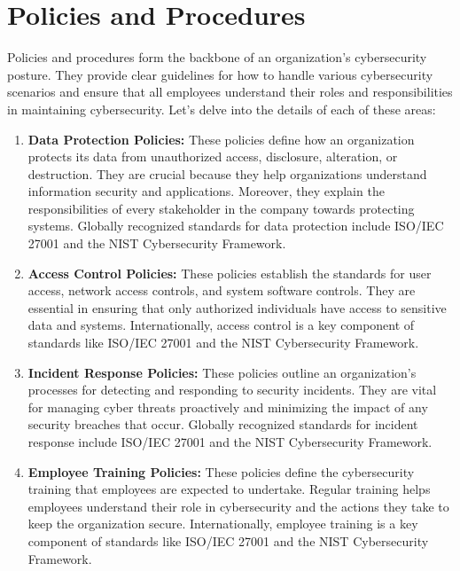\documentclass{article}
\begin{document}
\section{Policies and Procedures}
Policies and procedures form the backbone of an organization’s cybersecurity posture. They provide clear guidelines for how to handle various cybersecurity scenarios and ensure that all employees understand their roles and responsibilities in maintaining cybersecurity\cite{united-states-cybersecurity-and-infrastructure-security-agency-2023}\cite{pandey-2019}\cite{shacklett-2019}.
Let’s delve into the details of each of these areas:
\begin{enumerate}[label=\alph*)]
    \item \textbf{Data Protection Policies:} These policies define how an organization protects its data from unauthorized access, disclosure, alteration, or destruction\cite{united-states-cybersecurity-and-infrastructure-security-agency-2023}. They are crucial because they help organizations understand information security and applications. Moreover, they explain the responsibilities of every stakeholder in the company towards protecting systems\cite{pandey-2019}. Globally recognized standards for data protection include ISO/IEC 27001\cite{shacklett-2019} and the NIST Cybersecurity Framework\cite{the-center-for-internet-security-inc-no-date}.

    \item \textbf{Access Control Policies:} These policies establish the standards for user access, network access controls, and system software controls\cite{securityscorecard-2023}. They are essential in ensuring that only authorized individuals have access to sensitive data and systems\cite{microsoft-no-date}. Internationally, access control is a key component of standards like ISO/IEC 27001\cite{shacklett-2019} and the NIST Cybersecurity Framework\cite{the-center-for-internet-security-inc-no-date}.
    \item \textbf{Incident Response Policies:} These policies outline an organization’s processes for detecting and responding to security incidents\cite{united-states-cybersecurity-and-infrastructure-security-agency-2023}. They are vital for managing cyber threats proactively and minimizing the impact of any security breaches that occur. Globally recognized standards for incident response include ISO/IEC 27001\cite{shacklett-2019} and the NIST Cybersecurity Framework\cite{the-center-for-internet-security-inc-no-date}.
    \item \textbf{Employee Training Policies:} These policies define the cybersecurity training that employees are expected to undertake. Regular training helps employees understand their role in cybersecurity and the actions they take to keep the organization secure\cite{valamis-2023}. Internationally, employee training is a key component of standards like ISO/IEC 27001\cite{shacklett-2019} and the NIST Cybersecurity Framework\cite{the-center-for-internet-security-inc-no-date}.


\end{enumerate}
\end{document}
